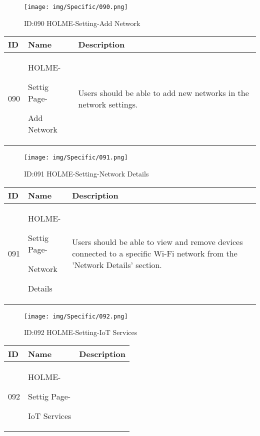 \documentclass[conference]{IEEEtran}
\begin{document}
\begin{enumerate}
\begin{figure}[h]
\centering                                         
\texttt{[image: img/Specific/090.png]}
\caption{ID:090 HOLME-Setting-Add Network}
\end{figure}
\begin{table}[h]
\def\arraystretch{1.2} \small
    \begin{tabular}{|p{1cm}|p{1.8cm}|p{5.0cm}|}
        \hline
        ID & Name & Description\\ \hline
         090 \par  & HOLME-\par Settig Page- \par Add Network & 
       Users should be able to add new networks in the network settings.
         \\ \hline
    \end{tabular}
\end{table}
\begin{figure}[h]
\centering                                         
\texttt{[image: img/Specific/091.png]}
\caption{ID:091 HOLME-Setting-Network Details}
\end{figure}
\begin{table}[h]
\def\arraystretch{1.2} \small
    \begin{tabular}{|p{1cm}|p{1.8cm}|p{5.0cm}|}
        \hline
        ID & Name & Description\\ \hline
         091 \par  & HOLME-\par Settig Page- \par Network \par  Details & 
       Users should be able to view and remove devices connected to a specific Wi-Fi network from the 'Network Details' section.
         \\ \hline
    \end{tabular}
\end{table}
\begin{figure}[h]
\centering                                         
\texttt{[image: img/Specific/092.png]}
\caption{ID:092 HOLME-Setting-IoT Services}
\end{figure}
\begin{table}[h]
\def\arraystretch{1.2} \small
    \begin{tabular}{|p{1cm}|p{1.8cm}|p{5.0cm}|}
        \hline
        ID & Name & Description\\ \hline
         092 \par  & HOLME-\par Settig Page- \par IoT Services& 

\end{tabular}
\end{table}
\end{enumerate}
\end{document}
